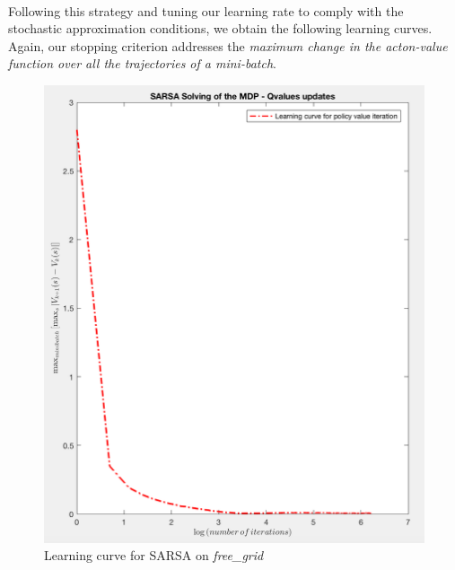\documentclass[a4paper]{report}
\begin{document}
{{{				\paragraph{} Following this strategy and tuning our learning rate to comply with the stochastic approximation conditions, we obtain the following learning curves. Again, our stopping criterion addresses the \emph{maximum change in the acton-value function over all the trajectories of a mini-batch}. 
				\begin{figure}[ht!]
					\begin{minipage}{0.4\linewidth}
						\includegraphics[width=0.9\linewidth]{sarsa_learning_curve_free_grid}
						\caption{Learning curve for SARSA on \emph{free\_grid}}
					\end{minipage}
					\hfill
					\begin{minipage}{0.4\linewidth}

\end{minipage}
\end{figure}}}}
\end{document}

